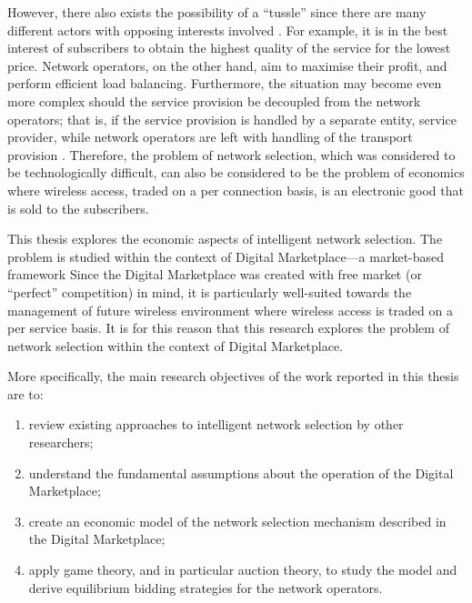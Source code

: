 However, there also exists the possibility of a ``tussle'' since there are many different actors with opposing interests involved \cite{Clark02}. For example, it is in the best interest of subscribers to obtain the highest quality of the service for the lowest price. Network operators, on the other hand, aim to maximise their profit, and perform efficient load balancing. Furthermore, the situation may become even more complex should the service provision be decoupled from the network operators; that is, if the service provision is handled by a separate entity, service provider, while network operators are left with handling of the transport provision \cite{DMBushTussle09}. Therefore, the problem of network selection, which was considered to be technologically difficult, can also be considered to be the problem of economics where wireless access, traded on a per connection basis, is an electronic good that is sold to the subscribers.

This thesis explores the economic aspects of intelligent network selection. The problem is studied within the context of Digital Marketplace---a  market-based framework  Since the Digital Marketplace was created with free market (or ``perfect'' competition) in mind, it is particularly well-suited towards the management of future wireless environment where wireless access is traded on a per service basis. It is for this reason that this research explores the problem of network selection within the context of Digital Marketplace.

More specifically, the main research objectives of the work reported in this thesis are to:
\begin{enumerate}
\item review existing approaches to intelligent network selection by other researchers;
\item understand the fundamental assumptions about the operation of the Digital Marketplace;
\item create an economic model of the network selection mechanism described in the Digital Marketplace;
\item apply game theory, and in particular auction theory, to study the model and derive equilibrium bidding strategies for the network operators.
\end{enumerate}

